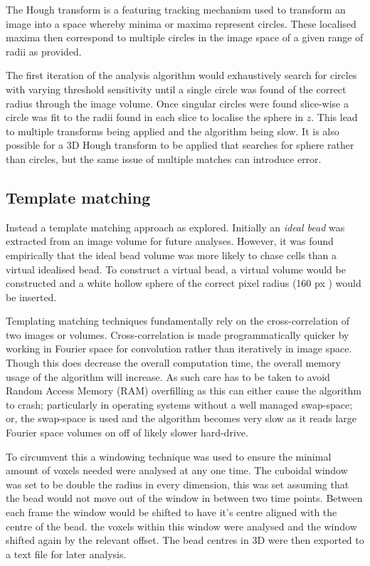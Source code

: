 The Hough transform is a featuring tracking mechanism used to transform an image into a space whereby minima or maxima represent circles.
These localised maxima then correspond to multiple circles in the image space of a given range of radii as provided.

The first iteration of the analysis algorithm would exhaustively search for circles with varying threshold sensitivity until a single circle was found of the correct radius through the image volume.
Once singular circles were found slice-wise a circle was fit to the radii found in each slice to localise the sphere in $z$.
This lead to multiple transforms being applied and the algorithm being slow.
It is also possible for a 3D Hough transform to be applied that searches for sphere rather than circles, but the same issue of multiple matches can introduce error.

\subsection{Template matching}

Instead a template matching approach as explored.
Initially an \emph{ideal bead} was extracted from an image volume for future analyses.
However, it was found empirically that the ideal bead volume was more likely to chase cells than a virtual idealised bead.
To construct a virtual bead, a virtual volume would be constructed and a white hollow sphere of the correct pixel radius (160 px %
) would be inserted.

Templating matching techniques fundamentally rely on the cross-correlation of two images or volumes.
Cross-correlation is made programmatically quicker by working in Fourier space for convolution rather than iteratively in image space.
Though this does decrease the overall computation time, the overall memory usage of the algorithm will increase.
As such care has to be taken to avoid Random Access Memory (RAM) overfilling as this can either cause the algorithm to crash; particularly in operating systems without a well managed swap-space; or, the swap-space is used and the algorithm becomes very slow as it reads large Fourier space volumes on off of likely slower hard-drive.

To circumvent this a windowing technique was used to ensure the minimal amount of voxels needed were analysed at any one time.
The cuboidal window was set to be double the radius in every dimension, this was set assuming that the bead would not move out of the window in between two time points.
Between each frame the window would be shifted to have it's centre aligned with the centre of the bead.
the voxels within this window were analysed and the window shifted again by the relevant offset.
The bead centres in 3D were then exported to a text file for later analysis.

